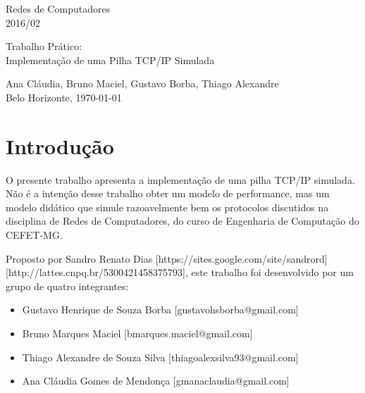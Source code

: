 \documentclass[11pt]{article}
\begin{document}
\thispagestyle{empty}

\begin{center}
\begin{minipage}[l]{10cm}{
\center
Redes de Computadores \\
2016/02 \\
}\end{minipage}
 \vfill
 \begin{minipage}[l]{11cm}{
   \begin{center}
   \Large{Trabalho Prático: \\ Implementação de uma Pilha TCP/IP Simulada}
   \end{center}
}\end{minipage}
\end{center}
 \vspace*{8cm}
 \begin{center}
 \begin{minipage}[l]{10cm}{
 \center Ana Cláudia, Bruno Maciel, Gustavo Borba, Thiago Alexandre\\
 Belo Horizonte, \today \\
 }
 \end{minipage}
 \end{center}

\newpage
\thispagestyle{empty}
\tableofcontents

\newpage
\clearpage
\setcounter{page}{1}

\section{Introdução}

    O presente trabalho apresenta a implementação de uma pilha TCP/IP simulada. Não é a intenção desse trabalho obter um modelo de performance, mas um modelo didático que simule razoavelmente bem os protocolos discutidos na disciplina de Redes de Computadores, do curso de Engenharia de Computação do CEFET-MG. 
    
    Proposto por Sandro Renato Dias [https://sites.google.com/site/sandrord] [http://lattes.cnpq.br/5300421458375793], este trabalho foi desenvolvido por um grupo de quatro integrantes:
    
    \begin{itemize}
        \item Gustavo Henrique de Souza Borba [gustavohsborba@gmail.com]
        \item Bruno Marques Maciel [bmarques.maciel@gmail.com]
        \item Thiago Alexandre de Souza Silva [thiagoalexsilva93@gmail.com]
        \item Ana Cláudia Gomes de Mendonça [gmanaclaudia@gmail.com]
    \end{itemize}
    
\end{document}
